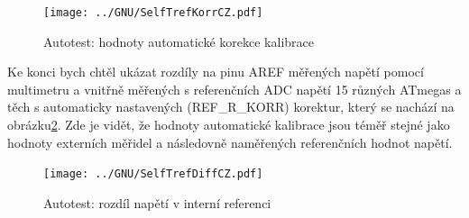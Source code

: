 \begin{figure}[H]
  \centering
  \texttt{[image: ../GNU/SelfTrefKorrCZ.pdf]}
  \caption{Autotest: hodnoty automatické korekce kalibrace}
  \label{fig:SelfTrefKorr}
\end{figure}

Ke konci bych chtěl ukázat rozdíly na pinu AREF měřených napětí pomocí multimetru
a vnitřně měřených s referenčních ADC napětí 15 různých ATmegas a těch s automaticky
nastavených (REF\_R\_KORR)  korektur, který se nachází na obrázku\ref{fig:SelfTrefDiff}.
Zde je vidět, že hodnoty automatické kalibrace jsou téměř stejné jako hodnoty externích měřidel a
následovně naměřených referenčních hodnot napětí.
\begin{figure}[H]
  \centering
  \texttt{[image: ../GNU/SelfTrefDiffCZ.pdf]}
  \caption{Autotest: rozdíl napětí v interní referenci}
  \label{fig:SelfTrefDiff}
\end{figure}

